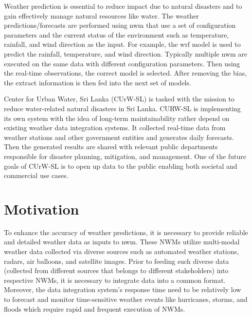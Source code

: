 Weather prediction is essential to reduce impact due to natural disasters and to gain effectively manage natural resources like water. The weather predictions/forecasts are performed using \acrfull{nwm} that use a set of configuration parameters and the current status of the environment such as temperature, rainfall, and wind direction as the input. For example, the \acrfull{wrf} model is used to predict the rainfall, temperature, and wind direction. Typically multiple \acrshort{nwm} are executed on the same data with different configuration parameters. Then using the real-time observations, the correct model is selected. After removing the bias, the extract information is then fed into the next set of models. 

Center for Urban Water, Sri Lanka (CUrW-SL) is tasked with the mission to reduce water-related natural disasters in Sri Lanka. CURW-SL is implementing its own system with the idea of long-term maintainability rather depend on existing weather data integration systems. It collected real-time data from weather stations and other government entities and generates daily forecasts. Then the generated results are shared with relevant public departments responsible for disaster planning, mitigation, and management. One of the future goals of CUrW-SL is to open up data to the public enabling both societal and commercial use cases. %

\section{Motivation}
To enhance the accuracy of weather predictions, it is necessary to provide reliable and detailed weather data as inputs to \acrshort{nwm}. These NWMs utilize multi-modal weather data collected via diverse sources such as automated weather stations, radars, air balloons, and satellite images. Prior to feeding such diverse data (collected from different sources that belongs to different stakeholders) into respective NWMs, it is necessary to integrate data into a common format. Moreover, the data integration system’s response time need to be relatively low to forecast and monitor time-sensitive weather events like hurricanes, storms, and floods which require rapid and frequent execution of NWMs.

